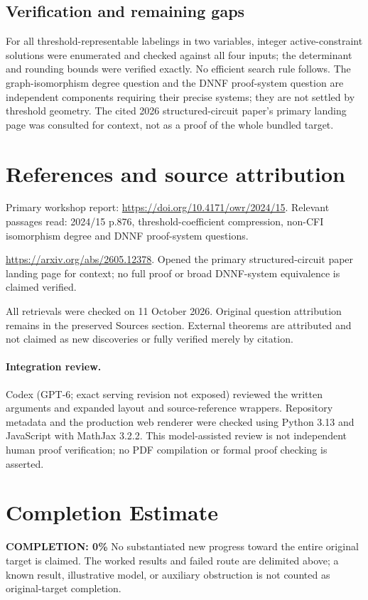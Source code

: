 \documentclass[11pt]{article}
\begin{document}
\subsection{Verification and remaining gaps}
For all threshold-representable labelings in two variables, integer active-constraint solutions were enumerated and checked against all four inputs; the determinant and rounding bounds were verified exactly. No efficient search rule follows. The graph-isomorphism degree question and the DNNF proof-system question are independent components requiring their precise systems; they are not settled by threshold geometry. The cited 2026 structured-circuit paper's primary landing page was consulted for context, not as a proof of the whole bundled target.

\section{References and source attribution}
Primary workshop report: \url{https://doi.org/10.4171/owr/2024/15}. Relevant passages read: 2024/15 p.876, threshold-coefficient compression, non-CFI isomorphism degree and DNNF proof-system questions.

\url{https://arxiv.org/abs/2605.12378}. Opened the primary structured-circuit paper landing page for context; no full proof or broad DNNF-system equivalence is claimed verified.

All retrievals were checked on 11 October 2026. Original question attribution remains in the preserved Sources section. External theorems are attributed and not claimed as new discoveries or fully verified merely by citation.


\paragraph{Integration review.} Codex (GPT-6; exact serving revision not exposed) reviewed the written arguments and expanded layout and source-reference wrappers. Repository metadata and the production web renderer were checked using Python 3.13 and JavaScript with MathJax 3.2.2. This model-assisted review is not independent human proof verification; no PDF compilation or formal proof checking is asserted.

\section{Completion Estimate}
\noindent\textbf{COMPLETION: 0\%}
No substantiated new progress toward the entire original target is claimed. The worked results and failed route are delimited above; a known result, illustrative model, or auxiliary obstruction is not counted as original-target completion.
\end{document}

